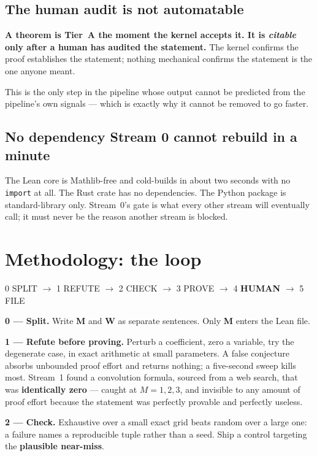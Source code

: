 \documentclass[11pt,a4paper]{article}
\begin{document}
\subsection{The human audit is not automatable}

\textbf{A theorem is Tier~A the moment the kernel accepts it. It is \emph{citable} only after a
human has audited the statement.} The kernel confirms the proof establishes the statement;
nothing mechanical confirms the statement is the one anyone meant.

This is the only step in the pipeline whose output cannot be predicted from the pipeline's own
signals — which is exactly why it cannot be removed to go faster.

\subsection{No dependency Stream 0 cannot rebuild in a minute}

The Lean core is Mathlib-free and cold-builds in about two seconds with no \texttt{import} at
all. The Rust crate has no dependencies. The Python package is standard-library only. Stream~0's
gate is what every other stream will eventually call; it must never be the reason another stream
is blocked.

\section{Methodology: the loop}

\begin{center}\ttfamily\small
0 SPLIT $\rightarrow$ 1 REFUTE $\rightarrow$ 2 CHECK $\rightarrow$ 3 PROVE $\rightarrow$
4 \textbf{HUMAN} $\rightarrow$ 5 FILE
\end{center}

\textbf{0 — Split.} Write \textbf{M} and \textbf{W} as separate sentences. Only \textbf{M} enters
the Lean file.

\textbf{1 — Refute before proving.} Perturb a coefficient, zero a variable, try the degenerate
case, in exact arithmetic at small parameters. A false conjecture absorbs unbounded proof effort
and returns nothing; a five-second sweep kills most. Stream~1 found a convolution formula,
sourced from a web search, that was \textbf{identically zero} — caught at $M = 1,2,3$, and
invisible to any amount of proof effort because the statement was perfectly provable and
perfectly useless.

\textbf{2 — Check.} Exhaustive over a small exact grid beats random over a large one: a failure
names a reproducible tuple rather than a seed. Ship a control targeting the \textbf{plausible
near-miss}.
\end{document}
